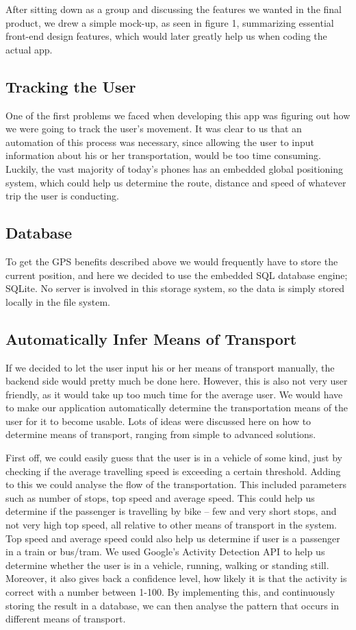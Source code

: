\documentclass[10pt,conference,compsocconf]{IEEEtran}
\begin{document}
After sitting down as a group and discussing the features we wanted in the final product, we drew a simple mock-up, as seen in figure 1, summarizing essential front-end design features, which would later greatly help us when coding the actual app.


\subsection{Tracking the User}

One of the first problems we faced when developing this app was figuring out how we were going to track the user’s movement. It was clear to us that an automation of this process was necessary, since allowing the user to input information about his or her transportation, would be too time consuming. Luckily, the vast majority of today’s phones has an embedded global positioning system, which could help us determine the route, distance and speed of whatever trip the user is conducting.

\subsection{Database}

To get the GPS benefits described above we would frequently have to store the current position, and here we decided to use the embedded SQL database engine; SQLite. No server is involved in this storage system, so the data is simply stored locally in the file system.

\subsection{Automatically Infer Means of Transport}

If we decided to let the user input his or her means of transport manually, the backend side would pretty much be done here. However, this is also not very user friendly, as it would take up too much time for the average user. We would have to make our application automatically determine the transportation means of the user for it to become usable. Lots of ideas were discussed here on how to determine means of transport, ranging from simple to advanced solutions.

First off, we could easily guess that the user is in a vehicle of some kind, just by checking if the average travelling speed is exceeding a certain threshold.
Adding to this we could analyse the flow of the transportation. This included parameters such as number of stops, top speed and average speed. This could help us determine if the passenger is travelling by bike – few and very short stops, and not very high top speed, all relative to other means of transport in the system. Top speed and average speed could also help us determine if user is a passenger in a train or bus/tram.
We used Google’s Activity Detection API to help us determine whether the user is in a vehicle, running, walking or standing still. Moreover, it also gives back a confidence level, how likely it is that the activity is correct with a number between 1-100. By implementing this, and continuously storing the result in a database, we can then analyse the pattern that occurs in different means of transport.
\end{document}
